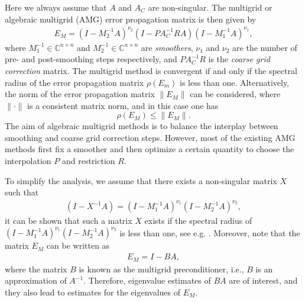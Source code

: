 \documentclass[final]{siamltex}
\newcommand{\innCnn}{\in\mathbb{C}^{n\times n}}
\newcommand{\beqo}{\begin{eqnarray*}}
\newcommand{\beq}{\begin{eqnarray}}
\newcommand{\eeqo}{\end{eqnarray*}}
\newcommand{\eeq}{\end{eqnarray}}
\numberwithin{equation}{section}
\begin{document}
Here we always assume  that $A$ and $A_C$ are  non-singular. 
The multigrid or algebraic multigrid (AMG) error
propagation matrix  is then given by
 \beq \label{mgiteration}
E_M = (I-M_2^{-1}A)^{\nu_2}(I -  PA_C^{-1}RA)(I-M_1^{-1}A)^{\nu_1},
\eeq
where $M_1^{-1} \innCnn$ and $M_2^{-1} \innCnn$  are   {\it smoothers}, $\nu_1$
and $\nu_2$  are the number of pre- and post-smoothing steps respectively, and
$PA_C^{-1}R$
is
the
{\it
coarse grid
correction} matrix. The multigrid method is convergent if and only if the
spectral radius of the
error propagation matrix
$\rho(E_m)$ is less than one.
Alternatively, the norm of the error propagation matrix $\|E_M\|$ 
can be considered, where
$\|\cdot\|$
is
a
consistent matrix
norm, and in this case one has  
\[
\rho(E_M) \leq \|E_M\|.
\]  
The aim of algebraic multigrid methods is to balance the interplay between
smoothing and coarse grid correction steps. However, most of the existing AMG
methods first fix a smoother and then optimize a certain quantity to choose
the interpolation $P$ and restriction $R$.

To simplify the analysis, we assume that there exists a non-singular matrix $X$
such that
\beq \label{mgx}
(I-X^{-1}A) = (I-M_1^{-1}A)^{\nu_1}(I-M_2^{-1}A)^{\nu_2},
\eeq
it can be shown that such a matrix $X$ exists if the spectral radius of $
(I-M_1^{-1}A)^{\nu_1}(I-M_2^{-1}A)^{\nu_2}$ is less  than one, see e.g.
\cite{BenS97}. Moreover, note that the matrix $E_M$ can be
written  as 
\beq \label{mgb}
E_M = I-BA,
\eeq
where the  matrix $B$ is known as the multigrid preconditioner, i.e., $B$ is an
approximation of $A^{-1}$.
Therefore,
eigenvalue estimates of $BA$ are of interest, and  they also lead to
estimates for
the eigenvalues of
$E_M$.


%

\end{document}
